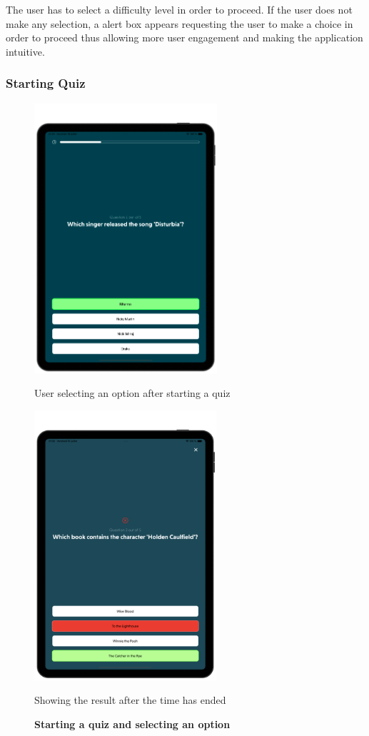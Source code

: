 The user has to select a difficulty level in order to proceed. If the user does not make any selection, a alert box appears requesting the user to make a choice in order to proceed thus allowing more user engagement and making the application intuitive.

\subsubsection{Starting Quiz}

\begin{figure}[H]
    \centering
    \begin{minipage}[b]{0.43\linewidth}
        \centering
        \includegraphics[height=10cm]{TabletUI/User selecting an option after starting a quiz.png}
        \caption{User selecting an option after starting a quiz}
    \end{minipage}
    \hspace{0.1\linewidth}
    \begin{minipage}[b]{0.43\linewidth}
        \centering
        \includegraphics[height=10cm]{TabletUI/Showing the result after the time has ended.png}
        \caption{Showing the result after the time has ended}
    \end{minipage}
    \vspace{0.5cm}
    \caption{\textbf{Starting a quiz and selecting an option}}
\end{figure}

